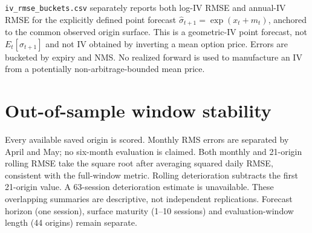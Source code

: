 \documentclass[11pt]{article}
\begin{document}
\texttt{iv\_rmse\_buckets.csv} separately reports both log-IV RMSE and annual-IV RMSE for the explicitly defined point forecast $\hat\sigma_{t+1}=\exp(x_t+m_t)$, anchored to the common observed origin surface. This is a geometric-IV point forecast, not $E_t[\sigma_{t+1}]$ and not IV obtained by inverting a mean option price. Errors are bucketed by expiry and NMS. No realized forward is used to manufacture an IV from a potentially non-arbitrage-bounded mean price.

\section{Out-of-sample window stability}

Every available saved origin is scored. Monthly RMS errors are separated by April and May; no six-month evaluation is claimed. Both monthly and 21-origin rolling RMSE take the square root after averaging squared daily RMSE, consistent with the full-window metric. Rolling deterioration subtracts the first 21-origin value. A 63-session deterioration estimate is unavailable. These overlapping summaries are descriptive, not independent replications. Forecast horizon (one session), surface maturity (1--10 sessions) and evaluation-window length (44 origins) remain separate.
\end{document}
